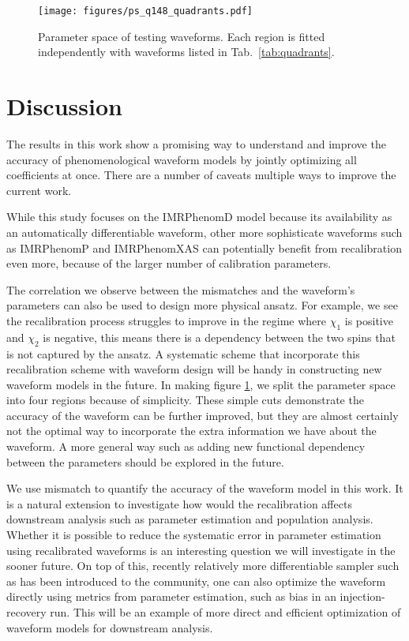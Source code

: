 \documentclass[twocolumn]{aastex631}
\begin{document}
\begin{figure}[t]
	\centering
	\texttt{[image: figures/ps\_q148\_quadrants.pdf]}
	\caption{Parameter space of testing waveforms. Each region is fitted independently with waveforms listed in Tab.~\ref{tab:quadrants}.}
	\label{fig:ps_q148_quadrant}
\end{figure}

\section{Discussion} \label{sec:discussion}

The results in this work show a promising way to understand and improve the
accuracy of phenomenological waveform models by jointly optimizing all
coefficients at once. There are a number of caveats multiple ways to improve the
current work.

While this study focuses on the IMRPhenomD model because its availability as an
automatically differentiable waveform, other more sophisticate waveforms such as
IMRPhenomP \citep{hannam2014simple, khan2019phenomenological} and IMRPhenomXAS
\citep{pratten2020setting,pratten2021computationally} can potentially benefit
from recalibration even more, because of the larger number of calibration
parameters. %

The correlation we observe between the mismatches and the waveform's parameters
can also be used to design more physical ansatz. For example, we see the
recalibration process struggles to improve in the regime where $\chi_{1}$ is
positive and $\chi_{2}$ is negative, this means there is a dependency between
the two spins that is not captured by the ansatz. A systematic scheme that
incorporate this recalibration scheme with waveform design will be handy in
constructing new waveform models in the future. In making figure
\ref{fig:ps_q148_quadrant}, we split the parameter space into four regions
because of simplicity. These simple cuts demonstrate the accuracy of the
waveform can be further improved, but they are almost certainly not the optimal
way to incorporate the extra information we have about the waveform. A more
general way such as adding new functional dependency between the parameters
should be explored in the future.

We use mismatch to quantify the accuracy of the waveform model in this work. It
is a natural extension to investigate how would the recalibration affects
downstream analysis such as parameter estimation and population analysis.
Whether it is possible to reduce the systematic error in parameter estimation
using recalibrated waveforms is an interesting question we will investigate in
the sooner future. On top of this, recently relatively more differentiable
sampler such as \citep{Wong:2022xvh} has been introduced to the community, one
can also optimize the waveform directly using metrics from parameter estimation,
such as bias in an injection-recovery run. This will be an example of
more direct and efficient optimization of waveform models for downstream analysis.
\end{document}
